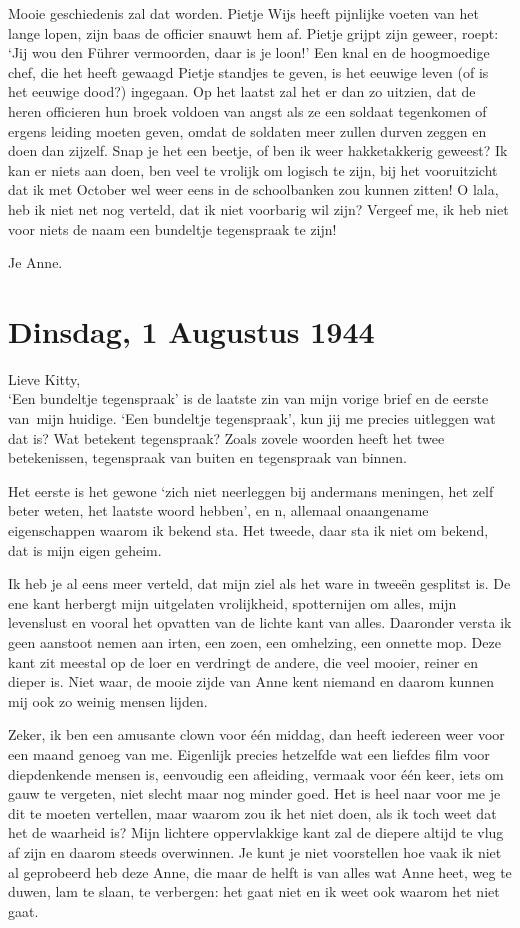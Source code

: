 \documentclass{book}
\begin{document}
Mooie geschiedenis zal dat worden. Pietje Wijs heeft pijnlijke voeten van het
lange lopen, zijn baas de officier snauwt hem af. Pietje grijpt zijn geweer,
roept: `Jij wou den Führer vermoorden, daar is je loon!' Een knal en de
hoogmoedige chef, die het heeft gewaagd Pietje standjes te geven, is het eeuwige
leven (of is het eeuwige dood?) ingegaan. Op het laatst zal het er dan zo
uitzien, dat de heren officieren hun broek voldoen van angst als ze een soldaat
tegenkomen of ergens leiding moeten geven, omdat de soldaten meer zullen durven
zeggen en doen dan zijzelf.  Snap je het een beetje, of ben ik weer
hakketakkerig geweest? Ik kan er niets aan doen, ben veel te vrolijk om logisch
te zijn, bij het vooruitzicht dat ik met October wel weer eens in de
schoolbanken zou kunnen zitten! O lala, heb ik niet net nog verteld, dat ik niet
voorbarig wil zijn? Vergeef me, ik heb niet voor niets de naam een bundeltje
tegenspraak te zijn!

Je Anne.

\section*{Dinsdag, 1 Augustus 1944}

Lieve Kitty,\\
`Een bundeltje tegenspraak' is de laatste zin van mijn vorige
brief en de eerste van~mijn huidige. `Een bundeltje tegenspraak', kun jij me
precies uitleggen wat dat is? Wat betekent tegenspraak? Zoals zovele woorden
heeft het twee betekenissen, tegenspraak van buiten en tegenspraak van binnen.

Het eerste is het gewone `zich niet neerleggen bij andermans meningen, het zelf
beter weten, het laatste woord hebben', en n, allemaal onaangename eigenschappen
waarom ik bekend sta. Het tweede, daar sta ik niet om bekend, dat is mijn eigen
geheim.

Ik heb je al eens meer verteld, dat mijn ziel als het ware in tweeën gesplitst
is. De ene kant herbergt mijn uitgelaten vrolijkheid, spotternijen om alles,
mijn levenslust en vooral het opvatten van de lichte kant van alles. Daaronder
versta ik geen aanstoot nemen aan irten, een zoen, een omhelzing, een onnette
mop. Deze kant zit meestal op de loer en verdringt de andere, die veel mooier,
reiner en dieper is.  Niet waar, de mooie zijde van Anne kent niemand en daarom
kunnen mij ook zo weinig mensen lijden.

Zeker, ik ben een amusante clown voor één middag, dan heeft iedereen weer voor
een maand genoeg van me. Eigenlijk precies hetzelfde wat een liefdes film voor
diepdenkende mensen is, eenvoudig een afleiding, vermaak voor één keer, iets om
gauw te vergeten, niet slecht maar nog minder goed. Het is heel naar voor me je
dit te moeten vertellen, maar waarom zou ik het niet doen, als ik toch weet dat
het de waarheid is? Mijn lichtere oppervlakkige kant zal de diepere altijd te
vlug af zijn en daarom steeds overwinnen. Je kunt je niet voorstellen hoe vaak
ik niet al geprobeerd heb deze Anne, die maar de helft is van alles wat Anne
heet, weg te duwen, lam te slaan, te verbergen: het gaat niet en ik weet ook
waarom het niet gaat.
\end{document}
